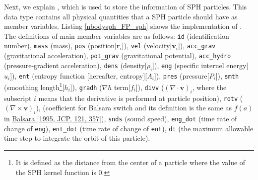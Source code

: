 \ifCpp %

\endifCpp
\ifFtn %

\endifFtn
\ifC %

\endifC


Next, we explain , which is used to store the information of SPH particles. This data type contains all physical quantities that a SPH particle should have as member variables. Listing \ref{nbodysph_FP_sph} shows the implementation of . The definitions of main member variables are as follows: \texttt{id} (identification number), \texttt{mass} (mass), \texttt{pos} (position[$\bm{r}_{i}$]), \texttt{vel} (velocity[$\bm{v}_{i}$]), \texttt{acc\_grav} (gravitational acceleration), \texttt{pot\_grav} (gravitational potential), \texttt{acc\_hydro} (pressure-gradient acceleration), \texttt{dens} (density[$\rho_{i}$]), \texttt{eng} (specific internel energy[$u_{i}$]), \texttt{ent} (entropy function [hereafter, entropy][$A_{i}$]), \texttt{pres} (pressure[$P_{i}$]), \texttt{smth} (smoothing length\footnote{It is defined as the distance from the center of a particle where the value of the SPH kernel function is 0.}[$h_{i}$]), \texttt{gradh} ($\nabla h$ term[$f_{i}$]), \texttt{divv} ($(\nabla\cdot\bm{v})_{i}$, where the subscript $i$ means that the derivative is performed at particle position), \texttt{rotv} ($(\nabla\times\bm{v})_{i}$),  (coefficient for Balsara switch and its definition is the same as $f(a)$ in \href{https://doi.org/10.1016/S0021-9991(95)90221-X}{Balsara [1995, JCP, 121, 357]}), \texttt{snds} (sound speed), \texttt{eng\_dot} (time rate of change of \texttt{eng}), \texttt{ent\_dot} (time rate of change of \texttt{ent}), \texttt{dt} (the maximum allowable time step to integrate the orbit of this particle).

